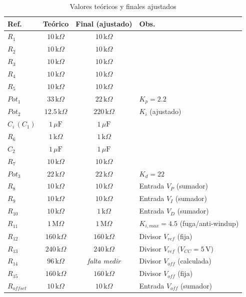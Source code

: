 \documentclass[conference]{IEEEtran}
\begin{document}
\begin{table}[t]
\centering
\caption{Valores teóricos y finales ajustados}
\label{tab:valores}
\small
\begin{tabular}{@{}l c c l@{}}
\toprule
\textbf{Ref.} & \textbf{Teórico} & \textbf{Final (ajustado)} & \textbf{Obs.} \\
\midrule
$R_1$ & $10\,\text{k}\Omega$ & $10\,\text{k}\Omega$ & \\
$R_2$ & $10\,\text{k}\Omega$ & $10\,\text{k}\Omega$ & \\
$R_3$ & $10\,\text{k}\Omega$ & $10\,\text{k}\Omega$ & \\
$R_4$ & $10\,\text{k}\Omega$ & $10\,\text{k}\Omega$ & \\
$R_5$ & $10\,\text{k}\Omega$ & $10\,\text{k}\Omega$ & \\
$Pot_1$ & $33\,\text{k}\Omega$ & $22\,\text{k}\Omega$ & $K_p=2.2$ \\
$Pot_2$ & $12.5\,\text{k}\Omega$ & $220\,\text{k}\Omega$ & $K_i$ (ajustado) \\
$C_i\,(C_1)$ & $1\,\mu\text{F}$ & $1\,\mu\text{F}$ & \\
$R_6$ & $1\,\text{k}\Omega$ & $1\,\text{k}\Omega$ & \\
$C_2$ & $1\,\mu\text{F}$ & $1\,\mu\text{F}$ & \\
$R_7$ & $10\,\text{k}\Omega$ & $10\,\text{k}\Omega$ & \\
$Pot_3$ & $22\,\text{k}\Omega$ & $22\,\text{k}\Omega$ & $K_d=22$ \\
$R_8$ & $10\,\text{k}\Omega$ & $10\,\text{k}\Omega$ & Entrada $V_P$ (sumador) \\
$R_9$ & $10\,\text{k}\Omega$ & $10\,\text{k}\Omega$ & Entrada $V_I$ (sumador) \\
$R_{10}$ & $10\,\text{k}\Omega$ & $1\,\text{k}\Omega$ & Entrada $V_D$ (sumador) \\
$R_{11}$ & $1\,\text{M}\Omega$ & $1\,\text{M}\Omega$ & $K_{i,max}=4.5$ (fuga/anti-windup) \\
$R_{12}$ & $160\,\text{k}\Omega$ & $160\,\text{k}\Omega$ & Divisor $V_{ref}$ (fija) \\
$R_{13}$ & $240\,\text{k}\Omega$ & $240\,\text{k}\Omega$ & Divisor $V_{ref}$ ($V_{CC}=5\,$V) \\
$R_{14}$ & $96\,\text{k}\Omega$ & \textit{falta medir} & Divisor $V_{off}$ (calculada) \\
$R_{15}$ & $160\,\text{k}\Omega$ & $160\,\text{k}\Omega$ & Divisor $V_{off}$ (fija) \\
$R_{offset}$ & $10\,\text{k}\Omega$ & $10\,\text{k}\Omega$ & Entrada $V_{off}$ (sumador) \\
\bottomrule
\end{tabular}
\end{table}
\end{document}
